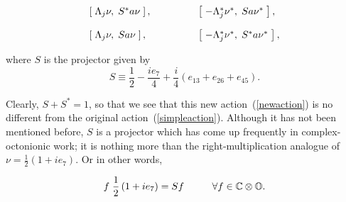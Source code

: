 \documentclass[letterpaper,12pt,titlepage,oneside,final]{book}
\newcommand{\CO}{\mathbb{C}\otimes\mathbb{O}}
\begin{document}
\begin{equation}\begin{array}{lll} \label{newaction} \left[\hspace{1mm}\Lambda_j \nu,\hspace{1mm} S^*a \nu \hspace{1mm}\right], & \hspace{1cm}&\left[\hspace{1mm}-\Lambda_j^* \nu^*, \hspace{1mm}Sa \nu^* \hspace{1mm}\right],  \vspace{4mm}\\

\left[\hspace{1mm}\Lambda_j \nu,\hspace{1mm} Sa \nu \hspace{1mm}\right], & \hspace{1cm}&\left[\hspace{1mm}-\Lambda_j^* \nu^*, \hspace{1mm}S^*a \nu^* \hspace{1mm}\right],
\end{array}\end{equation}

\noindent where $S$ is the projector given by
\begin{equation} S\equiv \frac{1}{2}-\frac{ie_7}{4}+\frac{i}{4}\left(e_{13}+e_{26}+e_{45}\right).
\end{equation}

 \noindent Clearly, $S+S^* = 1$, so that we see that this new action~(\ref{newaction}) is no different from the original action~(\ref{simpleaction}).  Although it has not been mentioned before, $S$ is a projector which has come up frequently in complex-octonionic work;  it is nothing more than the right-multiplication analogue of $\nu = \frac{1}{2}\left(1+ie_7\right)$.  Or in other words, 
 
 \begin{equation}
 f \hspace{1mm}\frac{1}{2}\left(1+ie_7\right) = Sf \hspace{1cm} \forall f\in \CO.
 \end{equation}
 
 
\end{document}
